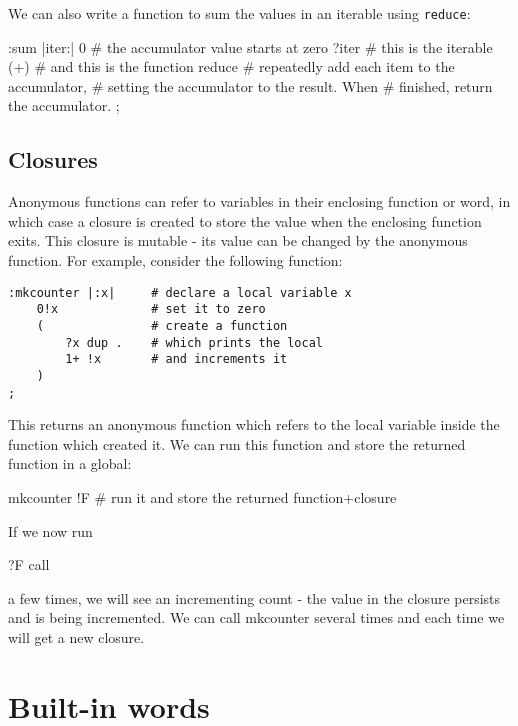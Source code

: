 We can also write a function to sum the values in an iterable using
\texttt{reduce}:
\begin{v}
:sum |iter:|
    0           # the accumulator value starts at zero
    ?iter       # this is the iterable
    (+)         # and this is the function 
    reduce      # repeatedly add each item to the accumulator,
                # setting the accumulator to the result. When
                # finished, return the accumulator.
;
\end{v}



\subsection{Closures}
Anonymous functions can refer to variables in their enclosing function or
word, in which case a closure is created to store the value when the enclosing
function exits. This closure is mutable - its value can be changed by the
anonymous function. For example, consider the following function:

\begin{lstlisting}
:mkcounter |:x|     # declare a local variable x
    0!x             # set it to zero
    (               # create a function
        ?x dup .    # which prints the local
        1+ !x       # and increments it
    )
;
\end{lstlisting}
This returns an anonymous function which refers to the local variable
inside the function which created it. We can run this function
and store the returned function in a global:

\begin{v}
mkcounter !F    # run it and store the returned function+closure
\end{v}
If we now run
\begin{v}
    ?F call
\end{v}
a few times, we will see an incrementing count - the value in the closure
persists and is being incremented. We can call mkcounter several times and
each time we will get a new closure.




\section{Built-in words}


